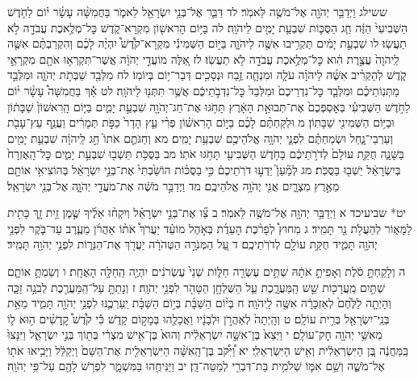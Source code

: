 \documentclass[twoside, openany, parskip=half, 11pt]{book}
\begin{document}
ששילג וַיְדַבֵּ֥ר יְהֹוָ֖ה אֶל־מֹשֶׁ֥ה לֵּאמֹֽר׃ לד דַּבֵּ֛ר אֶל־בְּנֵ֥י יִשְׂרָאֵ֖ל לֵאמֹ֑ר בַּחֲמִשָּׁ֨ה עָשָׂ֜ר י֗וֹם לַחֹ֤דֶשׁ הַשְּׁבִיעִי֙ הַזֶּ֔ה חַ֧ג הַסֻּכּ֛וֹת שִׁבְעַ֥ת יָמִ֖ים לַיהֹוָֽה׃ לה בַּיּ֥וֹם הָרִאשׁ֖וֹן מִקְרָא־קֹ֑דֶשׁ כׇּל־מְלֶ֥אכֶת עֲבֹדָ֖ה לֹ֥א תַעֲשֽׂוּ׃ לו שִׁבְעַ֣ת יָמִ֔ים תַּקְרִ֥יבוּ אִשֶּׁ֖ה לַיהֹוָ֑ה בַּיּ֣וֹם הַשְּׁמִינִ֡י מִקְרָא־קֹ֩דֶשׁ֩ יִהְיֶ֨ה לָכֶ֜ם וְהִקְרַבְתֶּ֨ם אִשֶּׁ֤ה לַֽיהֹוָה֙ עֲצֶ֣רֶת הִ֔וא כׇּל־מְלֶ֥אכֶת עֲבֹדָ֖ה לֹ֥א תַעֲשֽׂוּ׃ לז אֵ֚לֶּה מוֹעֲדֵ֣י יְהֹוָ֔ה אֲשֶׁר־תִּקְרְא֥וּ אֹתָ֖ם מִקְרָאֵ֣י קֹ֑דֶשׁ לְהַקְרִ֨יב אִשֶּׁ֜ה לַיהֹוָ֗ה עֹלָ֧ה וּמִנְחָ֛ה זֶ֥בַח וּנְסָכִ֖ים דְּבַר־י֥וֹם בְּיוֹמֽוֹ׃ לח מִלְּבַ֖ד שַׁבְּתֹ֣ת יְהֹוָ֑ה וּמִלְּבַ֣ד מַתְּנֽוֹתֵיכֶ֗ם וּמִלְּבַ֤ד כׇּל־נִדְרֵיכֶם֙ וּמִלְּבַד֙ כׇּל־נִדְבֹ֣תֵיכֶ֔ם אֲשֶׁ֥ר תִּתְּנ֖וּ לַיהֹוָֽה׃ לט אַ֡ךְ בַּחֲמִשָּׁה֩ עָשָׂ֨ר י֜וֹם לַחֹ֣דֶשׁ הַשְּׁבִיעִ֗י בְּאׇסְפְּכֶם֙ אֶת־תְּבוּאַ֣ת הָאָ֔רֶץ תָּחֹ֥גּוּ אֶת־חַג־יְהֹוָ֖ה שִׁבְעַ֣ת יָמִ֑ים בַּיּ֤וֹם הָֽרִאשׁוֹן֙ שַׁבָּת֔וֹן וּבַיּ֥וֹם הַשְּׁמִינִ֖י שַׁבָּתֽוֹן׃ מ וּלְקַחְתֶּ֨ם לָכֶ֜ם בַּיּ֣וֹם הָרִאשׁ֗וֹן פְּרִ֨י עֵ֤ץ הָדָר֙ כַּפֹּ֣ת תְּמָרִ֔ים וַעֲנַ֥ף עֵץ־עָבֹ֖ת וְעַרְבֵי־נָ֑חַל וּשְׂמַחְתֶּ֗ם לִפְנֵ֛י יְהֹוָ֥ה אֱלֹהֵיכֶ֖ם שִׁבְעַ֥ת יָמִֽים׃ מא וְחַגֹּתֶ֤ם אֹתוֹ֙ חַ֣ג לַֽיהֹוָ֔ה שִׁבְעַ֥ת יָמִ֖ים בַּשָּׁנָ֑ה חֻקַּ֤ת עוֹלָם֙ לְדֹרֹ֣תֵיכֶ֔ם בַּחֹ֥דֶשׁ הַשְּׁבִיעִ֖י תָּחֹ֥גּוּ אֹתֽוֹ׃ מב בַּסֻּכֹּ֥ת תֵּשְׁב֖וּ שִׁבְעַ֣ת יָמִ֑ים כׇּל־הָֽאֶזְרָח֙ בְּיִשְׂרָאֵ֔ל יֵשְׁב֖וּ בַּסֻּכֹּֽת׃ מג לְמַ֘עַן֮ יֵדְע֣וּ דֹרֹֽתֵיכֶם֒ כִּ֣י בַסֻּכּ֗וֹת הוֹשַׁ֙בְתִּי֙ אֶת־בְּנֵ֣י יִשְׂרָאֵ֔ל בְּהוֹצִיאִ֥י אוֹתָ֖ם מֵאֶ֣רֶץ מִצְרָ֑יִם אֲנִ֖י יְהֹוָ֥ה אֱלֹהֵיכֶֽם׃ מד וַיְדַבֵּ֣ר מֹשֶׁ֔ה אֶת־מֹעֲדֵ֖י יְהֹוָ֑ה אֶל־בְּנֵ֖י יִשְׂרָאֵֽל׃

יט* שביעיכד א וַיְדַבֵּ֥ר יְהֹוָ֖ה אֶל־מֹשֶׁ֥ה לֵּאמֹֽר׃ ב צַ֞ו אֶת־בְּנֵ֣י יִשְׂרָאֵ֗ל וְיִקְח֨וּ אֵלֶ֜יךָ שֶׁ֣מֶן זַ֥יִת זָ֛ךְ כָּתִ֖ית לַמָּא֑וֹר לְהַעֲלֹ֥ת נֵ֖ר תָּמִֽיד׃ ג מִחוּץ֩ לְפָרֹ֨כֶת הָעֵדֻ֜ת בְּאֹ֣הֶל מוֹעֵ֗ד יַעֲרֹךְ֩ אֹת֨וֹ אַהֲרֹ֜ן מֵעֶ֧רֶב עַד־בֹּ֛קֶר לִפְנֵ֥י יְהֹוָ֖ה תָּמִ֑יד חֻקַּ֥ת עוֹלָ֖ם לְדֹרֹֽתֵיכֶֽם׃ ד עַ֚ל הַמְּנֹרָ֣ה הַטְּהֹרָ֔ה יַעֲרֹ֖ךְ אֶת־הַנֵּר֑וֹת לִפְנֵ֥י יְהֹוָ֖ה תָּמִֽיד׃

ה וְלָקַחְתָּ֣ סֹ֔לֶת וְאָפִיתָ֣ אֹתָ֔הּ שְׁתֵּ֥ים עֶשְׂרֵ֖ה חַלּ֑וֹת שְׁנֵי֙ עֶשְׂרֹנִ֔ים יִהְיֶ֖ה הַֽחַלָּ֥ה הָאֶחָֽת׃ ו וְשַׂמְתָּ֥ אוֹתָ֛ם שְׁתַּ֥יִם מַֽעֲרָכ֖וֹת שֵׁ֣שׁ הַֽמַּעֲרָ֑כֶת עַ֛ל הַשֻּׁלְחָ֥ן הַטָּהֹ֖ר לִפְנֵ֥י יְהֹוָֽה׃ ז וְנָתַתָּ֥ עַל־הַֽמַּעֲרֶ֖כֶת לְבֹנָ֣ה זַכָּ֑ה וְהָיְתָ֤ה לַלֶּ֙חֶם֙ לְאַזְכָּרָ֔ה אִשֶּׁ֖ה לַֽיהֹוָֽה׃ ח בְּי֨וֹם הַשַּׁבָּ֜ת בְּי֣וֹם הַשַּׁבָּ֗ת יַֽעַרְכֶ֛נּוּ לִפְנֵ֥י יְהֹוָ֖ה תָּמִ֑יד מֵאֵ֥ת בְּנֵֽי־יִשְׂרָאֵ֖ל בְּרִ֥ית עוֹלָֽם׃ ט וְהָֽיְתָה֙ לְאַהֲרֹ֣ן וּלְבָנָ֔יו וַאֲכָלֻ֖הוּ בְּמָק֣וֹם קָדֹ֑שׁ כִּ֡י קֹ֩דֶשׁ֩ קׇֽדָשִׁ֨ים ה֥וּא ל֛וֹ מֵאִשֵּׁ֥י יְהֹוָ֖ה חׇק־עוֹלָֽם׃
י וַיֵּצֵא֙ בֶּן־אִשָּׁ֣ה יִשְׂרְאֵלִ֔ית וְהוּא֙ בֶּן־אִ֣ישׁ מִצְרִ֔י בְּת֖וֹךְ בְּנֵ֣י יִשְׂרָאֵ֑ל וַיִּנָּצוּ֙ בַּֽמַּחֲנֶ֔ה בֶּ֚ן הַיִּשְׂרְאֵלִ֔ית וְאִ֖ישׁ הַיִּשְׂרְאֵלִֽי׃ יא וַ֠יִּקֹּ֠ב בֶּן־הָֽאִשָּׁ֨ה הַיִּשְׂרְאֵלִ֤ית אֶת־הַשֵּׁם֙ וַיְקַלֵּ֔ל וַיָּבִ֥יאוּ אֹת֖וֹ אֶל־מֹשֶׁ֑ה וְשֵׁ֥ם אִמּ֛וֹ שְׁלֹמִ֥ית בַּת־דִּבְרִ֖י לְמַטֵּה־דָֽן׃ יב וַיַּנִּיחֻ֖הוּ בַּמִּשְׁמָ֑ר לִפְרֹ֥שׁ לָהֶ֖ם עַל־פִּ֥י יְהֹוָֽה׃
\end{document}
